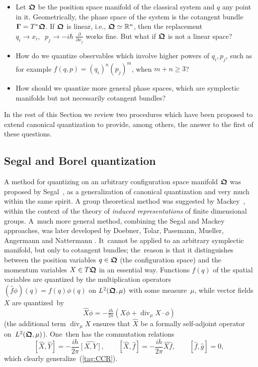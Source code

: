 \documentclass[12pt]{amsart}
\numberwithin{equation}{section}
\theoremstyle{remark}
\newcommand\XX{{\bfrakQ}}
\newcommand{\bigam}{\mbox{\boldmath $\Gamma$}}
\newcommand{\bfrakQ}{\mbox{\boldmath $\mathfrak Q$}}
\begin{document}
\begin{itemize}

\item  Let $\bfrakQ$ be the position space manifold of the classical
system and $q$ any point in it. Geometrically, the phase space of the system
is the cotangent bundle $\bigam = T^{*}\bfrakQ$.
 If $\bfrakQ$ is linear, i.e., $\bfrakQ
\simeq {\mathbb R}^n$, then the replacement $q_i \rightarrow x_i,
\;\;
p_{j} \rightarrow -i\hbar\;{\displaystyle\frac {\partial}{\partial x_j}}$
works fine. But what if $\bfrakQ$ is not a linear space?

\item How do we quantize observables which involve higher powers
of $q_i, p_{j}$, such as for example $f(q,p) = (q_i)^{n}(p_{j})^{m}$,
when $m+n \geq 3$?

\item How should we  quantize more general phase spaces, which are symplectic
manifolds but not necessarily cotangent bundles?

\end{itemize}

In the rest of this  Section we review two procedures which have been proposed
to extend  canonical quantization to provide, among others, the answer to the
first of these questions.


\subsection{Segal and Borel quantization}
\label{sec-segborelquant}

A method for quantizing on an arbitrary configuration space manifold $\bfrakQ$
was proposed by Segal~\cite{bib:Segal}, as a generalization of canonical
quantization and very much within the same spirit. A group theoretical method
was suggested by Mackey~\cite{bib:Mack}, within the context of the theory of
{\it induced representations} of finite dimensional groups. A~much more general
method, combining the Segal and Mackey approaches, was later developed by
Doebner, Tolar, Pasemann, Mueller, Angermann and Nattermann \cite{bib:-doebtol,
bib:DoebNa,bib:-nattermann}. It~cannot be applied to an arbitrary symplectic
manifold, but only to cotangent bundles; the~reason is that it distinguishes
between the position variables $q\in\XX$ (the configuration space) and the
momentum variables $X\in T \XX$ in an essential way. Functions $f(q)$ of the
spatial variables are quantized by the multiplication operators
$(\widehat f \phi)(q) =f(q) \phi(q)$ on $L^2(\XX,\mu)$ with some measure~$\mu$,
while vector fields $X$ are quantized~by
$$ \widehat X \phi = -\tfrac{ih}{2\pi}
  (X\phi + \operatorname{div}_\mu X\cdot\phi)  $$
(the additional term $\operatorname{div}_\mu X$ ensures that $\widehat X$
be a formally self-adjoint operator on~$L^2(\XX,\mu)$). One~then has the
commutation relations
$$ [\widehat X,\widehat Y]=-\frac{ih}{2\pi} \widehat {[X,Y]},
\qquad [\widehat X,\widehat f]=-\frac{ih}{2\pi} \widehat {Xf},
\qquad [\widehat f,\widehat g]=0,  $$
which clearly generalize~(\ref{tag:CCR}).
\end{document}
